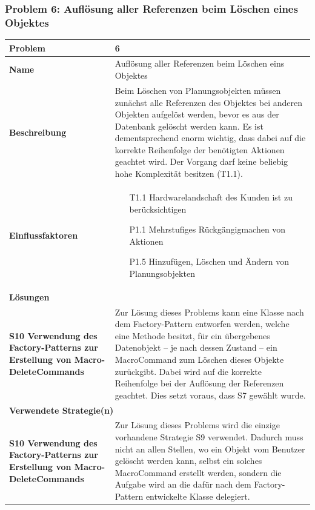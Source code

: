 \documentclass[fontsize=12pt,paper=a4,twoside]{scrartcl}
\begin{document}
\subsubsection{Problem 6: Auflösung aller Referenzen beim Löschen eines Objektes}
\begin{tabularx}{\textwidth}{|p{6cm}|X|}
 \hline
 \textbf{Problem} & 6\\\hline
 \textbf{Name} & Auflösung aller Referenzen beim Löschen eins Objektes\\\hline 
 \textbf{Beschreibung} & 
Beim Löschen von Planungsobjekten müssen zunächst alle Referenzen des Objektes bei anderen Objekten aufgelöst werden, bevor es aus der Datenbank gelöscht werden kann. Es ist dementsprechend enorm wichtig, dass dabei auf die korrekte Reihenfolge der benötigten Aktionen geachtet wird. Der Vorgang darf keine beliebig hohe Komplexität besitzen (T1.1).\\\hline
 \textbf{Einflussfaktoren} &
 \begin{itemize}
\item[T1.1] Hardwarelandschaft des Kunden ist zu berücksichtigen
\item[P1.1] Mehrstufiges Rückgängigmachen von Aktionen
\item[P1.5] Hinzufügen, Löschen und Ändern von Planungsobjekten
 \end{itemize}\\\hline
\multicolumn{2}{|l|}{\textbf{Lösungen}} \\\hline
\textbf{S10 Verwendung des Factory-Patterns zur Erstellung von Macro-DeleteCommands} & Zur Lösung dieses Problems kann eine Klasse nach dem Factory-Pattern entworfen werden, welche eine Methode besitzt, für ein übergebenes Datenobjekt -- je nach dessen Zustand -- ein MacroCommand zum Löschen dieses Objekte zurückgibt. Dabei wird auf die korrekte Reihenfolge bei der Auflösung der Referenzen geachtet. Dies setzt voraus, dass S7 gewählt wurde. \\\hline
\multicolumn{2}{|l|}{\textbf{Verwendete Strategie(n)}} \\\hline
 \textbf{S10 Verwendung des Factory-Patterns zur Erstellung von Macro-DeleteCommands}   & Zur Lösung dieses Problems wird die einzige vorhandene Strategie S9 verwendet. Dadurch muss nicht an allen Stellen, wo ein Objekt vom Benutzer gelöscht werden kann, selbst ein solches MacroCommand erstellt werden, sondern die Aufgabe wird an die dafür nach dem Factory-Pattern entwickelte Klasse delegiert. \\\hline
\end{tabularx}
\newpage
\end{document}
